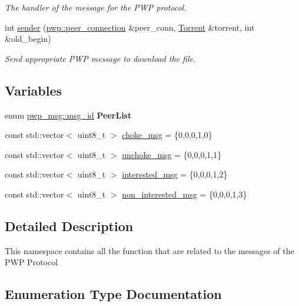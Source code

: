 \begin{DoxyCompactItemize}
\begin{DoxyCompactList}\small\item\em The handler of the message for the P\+WP protocol. \end{DoxyCompactList}\item 
int \hyperlink{namespacepwp__msg_ab578b213d293636d33efc24382f16b25}{sender} (\hyperlink{structpwp_1_1peer__connection}{pwp\+::peer\+\_\+connection} \&peer\+\_\+conn, \hyperlink{structtorr_1_1Torrent}{Torrent} \&torrent, int \&old\+\_\+begin)
\begin{DoxyCompactList}\small\item\em Send appropriate P\+WP message to download the file. \end{DoxyCompactList}\end{DoxyCompactItemize}
\subsection*{Variables}
\begin{DoxyCompactItemize}
\item 
\mbox{\label{namespacepwp__msg_ae962e65b1871714756b6aeb4722a8caf}} 
enum \hyperlink{namespacepwp__msg_a0b9a29508f00a30e5138d2b78f4b1daf}{pwp\+\_\+msg\+::msg\+\_\+id} {\bfseries Peer\+List}
\item 
const std\+::vector$<$ uint8\+\_\+t $>$ \hyperlink{namespacepwp__msg_a695ee2efb59a7c258559f19440fe6998}{choke\+\_\+msg} = \{0,0,0,1,0\}
\item 
const std\+::vector$<$ uint8\+\_\+t $>$ \hyperlink{namespacepwp__msg_acdc5eb698534e84a15db0e061c511e7c}{unchoke\+\_\+msg} = \{0,0,0,1,1\}
\item 
const std\+::vector$<$ uint8\+\_\+t $>$ \hyperlink{namespacepwp__msg_afc68b17ce131c52fa0beb0cc7185778b}{interested\+\_\+msg} = \{0,0,0,1,2\}
\item 
const std\+::vector$<$ uint8\+\_\+t $>$ \hyperlink{namespacepwp__msg_a16a5f22f784d872342a82af9f6b77830}{non\+\_\+interested\+\_\+msg} = \{0,0,0,1,3\}
\end{DoxyCompactItemize}


\subsection{Detailed Description}
This namespace contains all the function that are related to the messages of the P\+WP Protocol 

\subsection{Enumeration Type Documentation}
\mbox{\label{namespacepwp__msg_a0b9a29508f00a30e5138d2b78f4b1daf}} 

